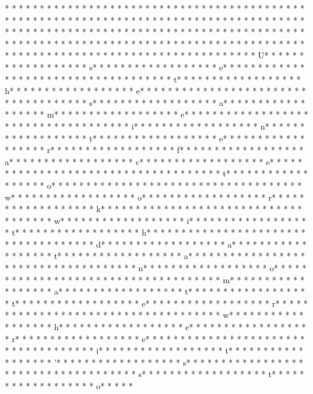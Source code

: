* * *  * * *  * * *  *  * * *  *  * * *  * 	* * *  * * *  * * *  *  * * *  *  * * *  * 	* * *  * * *  * * *  *  * * *  *  * * *  * * *  * * *  *  * * *  *  * * *  * * *  * * *  *  * * *  *  * * *  *  * * *  * * *  * * *  *  * * *  *  * * *  *  * * *  * * *  * * *  *  * * *  *  * * *  *  * * *  * * *  * * *  *  * * *  *  * * *  *  * * *  * * *  * * *  *  * * *  *  * * *  *  * * *  * * *  * * *  *  * * *  *  * * *  *  * * *  * * *  * * *  *  * * *  *  * * *  *  * * *  * * *  * * *  *  * * *  *  * * *  * U* * *  * * *  * * *  *  * * *  *  * * *  * s* * *  * * *  * * *  *  * * *  *  * * *  * e* * *  * * *  * * *  *  * * *  *  * * *  *  * * *  * * *  * * *  *  * * *  *  * * *  * t* * *  * * *  * * *  *  * * *  *  * * *  * h* * *  * * *  * * *  *  * * *  *  * * *  * e* * *  * * *  * * *  *  * * *  *  * * *  *  * * *  * * *  * * *  *  * * *  *  * * *  * s* * *  * * *  * * *  *  * * *  *  * * *  * a* * *  * * *  * * *  *  * * *  *  * * *  * m* * *  * * *  * * *  *  * * *  *  * * *  * e* * *  * * *  * * *  *  * * *  *  * * *  *  * * *  * * *  * * *  *  * * *  *  * * *  * i* * *  * * *  * * *  *  * * *  *  * * *  * n* * *  * * *  * * *  *  * * *  *  * * *  * t* * *  * * *  * * *  *  * * *  *  * * *  * e* * *  * * *  * * *  *  * * *  *  * * *  * r* * *  * * *  * * *  *  * * *  *  * * *  * f* * *  * * *  * * *  *  * * *  *  * * *  * a* * *  * * *  * * *  *  * * *  *  * * *  * c* * *  * * *  * * *  *  * * *  *  * * *  * e* * *  * * *  * * *  *  * * *  *  * * *  *  * * *  * * *  * * *  *  * * *  *  * * *  * t* * *  * * *  * * *  *  * * *  *  * * *  * o* * *  * * *  * * *  *  * * *  *  * * *  *  * * *  * * *  * * *  *  * * *  *  * * *  * w* * *  * * *  * * *  *  * * *  *  * * *  * o* * *  * * *  * * *  *  * * *  *  * * *  * r* * *  * * *  * * *  *  * * *  *  * * *  * k* * *  * * *  * * *  *  * * *  *  * * *  *  * * *  * * *  * * *  *  * * *  *  * * *  * w* * *  * * *  * * *  *  * * *  *  * * *  * i* * *  * * *  * * *  *  * * *  *  * * *  * t* * *  * * *  * * *  *  * * *  *  * * *  * h* * *  * * *  * * *  *  * * *  *  * * *  *  * * *  * * *  * * *  *  * * *  *  * * *  * d* * *  * * *  * * *  *  * * *  *  * * *  * a* * *  * * *  * * *  *  * * *  *  * * *  * t* * *  * * *  * * *  *  * * *  *  * * *  * a* * *  * * *  * * *  *  * * *  *  * * *  *  * * *  * * *  * * *  *  * * *  *  * * *  * n* * *  * * *  * * *  *  * * *  *  * * *  * o* * *  * * *  * * *  *  * * *  *  * * *  *  * * *  * * *  * * *  *  * * *  *  * * *  * m* * *  * * *  * * *  *  * * *  *  * * *  * a* * *  * * *  * * *  *  * * *  *  * * *  * t* * *  * * *  * * *  *  * * *  *  * * *  * t* * *  * * *  * * *  *  * * *  *  * * *  * e* * *  * * *  * * *  *  * * *  *  * * *  * r* * *  * * *  * * *  *  * * *  *  * * *  *  * * *  * * *  * * *  *  * * *  *  * * *  * w* * *  * * *  * * *  *  * * *  *  * * *  * h* * *  * * *  * * *  *  * * *  *  * * *  * e* * *  * * *  * * *  *  * * *  *  * * *  * r* * *  * * *  * * *  *  * * *  *  * * *  * e* * *  * * *  * * *  *  * * *  *  * * *  *  * * *  * * *  * * *  *  * * *  *  * * *  * i* * *  * * *  * * *  *  * * *  *  * * *  * t* * *  * * *  * * *  *  * * *  *  * * *  * '* * *  * * *  * * *  *  * * *  *  * * *  * s* * *  * * *  * * *  *  * * *  *  * * *  *  * * *  * * *  * * *  *  * * *  *  * * *  * s* * *  * * *  * * *  *  * * *  *  * * *  * t* * *  * * *  * * *  *  * * *  *  * * *  * o* * *  * * 